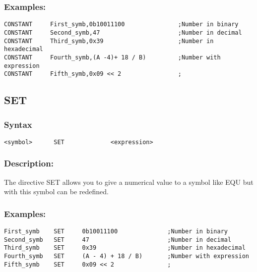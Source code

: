         \subsubsection{Examples:}
        {
            \usecodefont
            \verb'CONSTANT     First_symb,0b10011100               ;Number in binary'\\
            \verb'CONSTANT     Second_symb,47                      ;Number in decimal'\\
            \verb'CONSTANT     Third_symb,0x39                     ;Number in hexadecimal'\\
            \verb'CONSTANT     Fourth_symb,(A -4)+ 18 / B)         ;Number with expression'\\
            \verb'CONSTANT     Fifth_symb,0x09 << 2                ;'\\
        }

    \subsection{SET}
        \subsubsection{Syntax}
        {
            \usecodefont
            \verb'<symbol>      SET             <expression>'
        }

        \subsubsection{Description:}
            The directive SET allows you to give a numerical value to a symbol like EQU but with this symbol can be redefined.

        \subsubsection{Examples:}
        {
            \usecodefont
            \verb'First_symb    SET     0b10011100              ;Number in binary'\\
            \verb'Second_symb   SET     47                      ;Number in decimal'\\
            \verb'Third_symb    SET     0x39                    ;Number in hexadecimal'\\
            \verb'Fourth_symb   SET     (A - 4) + 18 / B)       ;Number with expression'\\
            \verb'Fifth_symb    SET     0x09 << 2               ;'\\
        }

